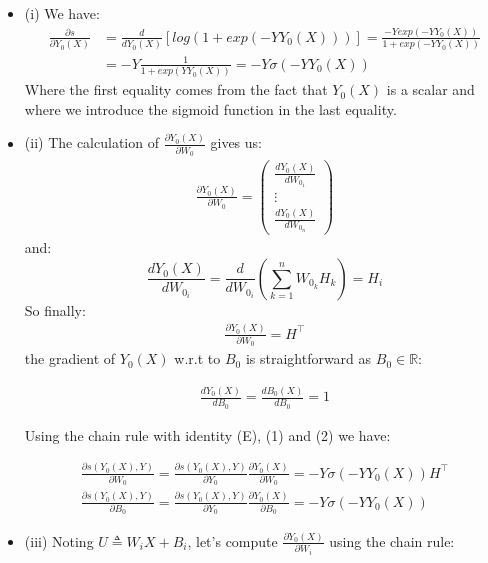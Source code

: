 \documentclass{article}
\begin{document}
\begin{itemize}
\item (i) We have:
	\begin{align*}
	\frac{\partial s}{\partial Y_0(X)} &= \frac{d}{d Y_0(X)}[log(1 + exp(-YY_0(X)))] = \frac{-Y exp(-YY_0(X))}{1 + exp(-YY_0(X))} \\
	&= -Y \frac{1}{1 + exp(YY_0(X))} = -Y \sigma (-YY_0(X))\tag{E}
	\end{align*}
	Where the first equality comes from the fact that $Y_0(X)$ is a scalar and where we introduce the sigmoid function in the last equality.

\item (ii) The calculation of $\frac{\partial Y_0(X)}{\partial W_0}$ gives us:
\begin{align*}
\frac{\partial Y_0(X)}{\partial W_0} = \begin{pmatrix} 
\frac{d Y_0(X)}{d W_{0_1}} \\
\vdots \\
\frac{d Y_0(X)}{d W_{0_n}}
\end{pmatrix}
\end{align*}
and:
$$
\frac{d Y_0(X)}{d W_{0_i}} = \frac{d}{d W_{0_i}}\left(\sum\limits_{k=1}^n W_{0_k}H_k\right) = H_i
$$
So finally:
\begin{align}
\frac{\partial Y_0(X)}{\partial W_0} = H^{\intercal}
\end{align}
the gradient of $Y_0(X)$ w.r.t to $B_0$ is straightforward as $B_0 \in \mathbb{R}$:

\begin{align}
\frac{d Y_0(X)}{d B_0} = \frac{d B_0(X)}{d B_0} = 1
\end{align}

Using the chain rule with identity (E), (1) and (2) we have:

\begin{framed}
\begin{align*}
\frac{\partial s(Y_0(X), Y)}{\partial W_0} = \frac{\partial s(Y_0(X), Y)}{\partial Y_0} \frac{\partial Y_0(X)}{\partial W_0} = -Y \sigma (-YY_0(X)) H^{\intercal} \\
\frac{\partial s(Y_0(X), Y)}{\partial B_0} = \frac{\partial s(Y_0(X), Y)}{\partial Y_0} \frac{\partial Y_0(X)}{\partial B_0} = -Y \sigma (-YY_0(X))
\end{align*}
\end{framed}

\item (iii) Noting $U \triangleq W_i X + B_i$, let's compute $\frac{\partial Y_0(X)}{\partial W_i}$ using the chain rule:


\end{itemize}
\end{document}
